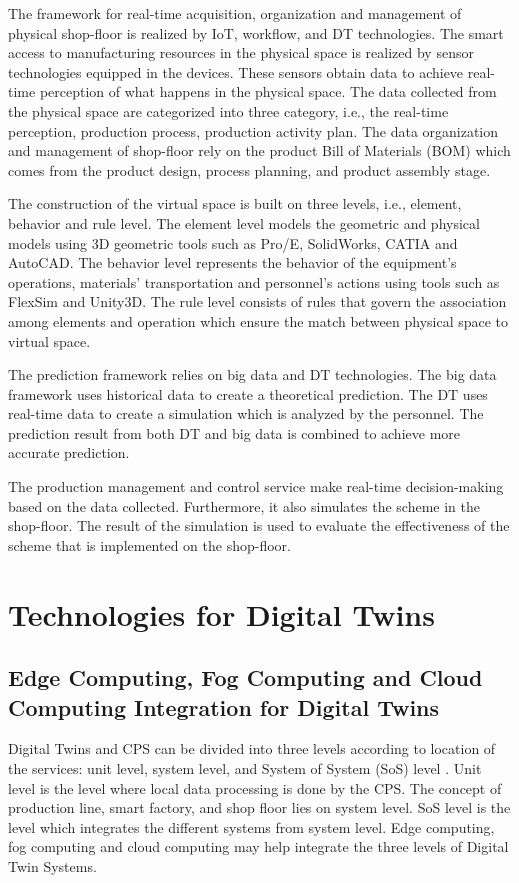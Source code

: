 \documentclass[article]{aaltoseries}
\begin{document}
The framework for real-time acquisition, organization and management of physical shop-floor is realized by IoT, workflow, and DT technologies. The smart access to manufacturing resources in the physical space is realized by sensor technologies equipped in the devices. These sensors obtain data to achieve real-time perception of what happens in the physical space. The data collected from the physical space are categorized into three category, i.e., the real-time perception, production process, production activity plan. The data organization and management of shop-floor rely on the product Bill of Materials (BOM) which comes from the product design, process planning, and product assembly stage.

The construction of the virtual space is built on three levels, i.e., element, behavior and rule level. The element level models the geometric and physical models using 3D geometric tools such as Pro/E, SolidWorks, CATIA and AutoCAD. The behavior level represents the behavior of the equipment's operations, materials' transportation and personnel's actions using tools such as FlexSim and Unity3D. The rule level consists of rules that govern the association among elements and operation which ensure the match between physical space to virtual space.

The prediction framework relies on big data and DT technologies. The big data framework uses historical data to create a theoretical prediction. The DT uses real-time data to create a simulation which is analyzed by the personnel. The prediction result from both DT and big data is combined to achieve more accurate prediction.

The production management and control service make real-time decision-making based on the data collected. Furthermore, it also simulates the scheme in the shop-floor. The result of the simulation is used to evaluate the effectiveness of the scheme that is implemented on the shop-floor.


\section{Technologies for Digital Twins}
\subsection{Edge Computing, Fog Computing and Cloud Computing Integration for Digital Twins}
Digital Twins and CPS can be divided into three levels according to location of the services: unit level, system level, and System of System (SoS) level \cite{qi2018modeling}. Unit level is the level where local data processing is done by the CPS. The concept of production line, smart factory, and shop floor lies on system level. SoS level is the level which integrates the different systems from system level. Edge computing, fog computing and cloud computing may help integrate the three levels of Digital Twin Systems.
\end{document}
